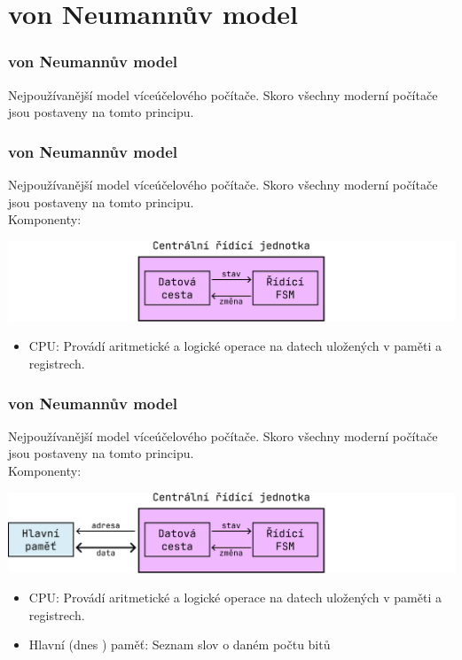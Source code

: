 \documentclass[aspectratio=169,11pt,svgnames,handout]{beamer}
\begin{document}
\section{von Neumannův model}

\begin{frame}
 \frametitle{von Neumannův model}
 Nejpoužívanější model víceúčelového počítače. Skoro všechny moderní počítače
 jsou postaveny na tomto principu.
\end{frame}

\begin{frame}
 \frametitle{von Neumannův model}
 Nejpoužívanější model víceúčelového počítače. Skoro všechny moderní počítače
 jsou postaveny na tomto principu.\\
 Komponenty:
 \vspace*{-1em}
 \begin{center}
  \includegraphics[width=.75\textwidth]{von-neumann-1.pdf}
 \end{center}
 \begin{itemize}[label=\textbullet]
  \item \alert{CPU}: Provádí aritmetické a logické operace na datech uložených v
   paměti a registrech.
 \end{itemize}
\end{frame}

\begin{frame}
 \frametitle{von Neumannův model}
 Nejpoužívanější model víceúčelového počítače. Skoro všechny moderní počítače
 jsou postaveny na tomto principu.\\
 Komponenty:
 \vspace*{-1em}
 \begin{center}
  \includegraphics[width=.75\textwidth]{von-neumann-2.pdf}
 \end{center}
 \begin{itemize}[label=\textbullet]
  \item \alert{CPU}: Provádí aritmetické a logické operace na datech uložených v
   paměti a registrech.
  \item \alert{Hlavní (dnes ) paměť}: Seznam \alert{slov} o daném
   počtu \alert{bitů} 
 \end{itemize}
\end{frame}
\end{document}
